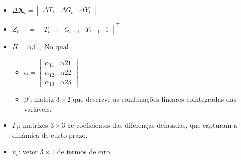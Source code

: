 \documentclass[a4paper, 12pt, openany, oneside, brazil]{abntex2}
\begin{document}


\postextual



%







% 
% 
%



% 



\begin{itemize}
	\item $\Delta \mathbf{X}_t = \begin{bmatrix} \Delta T_t & \Delta G_t & \Delta Y_t \end{bmatrix}^\mathsf{T}$
	\item $Z_{t-1} = \begin{bmatrix}
			T_{t-1} & G_{t-1} & Y_{t-1} & 1
	\end{bmatrix}^\mathsf{T}$
	\item $\Pi = \alpha \beta^\mathsf{T},\text{ No qual:}$
	\begin{itemize}
		\item $\alpha = \begin{bmatrix}
				\alpha_{11} & \alpha{21} \\
				\alpha_{12} & \alpha{22} \\
				\alpha_{13} & \alpha{23}
			\end{bmatrix}$
            \item \(\beta'\): matriz \(3 \times 2\) que descreve as combinações lineares cointegradas das variáveis.
        \end{itemize}
    \item \(\Gamma_i\): matrizes \(3 \times 3\) de coeficientes das diferenças defasadas, que capturam a dinâmica de curto prazo.
    \item \(u_t\): vetor \(3 \times 1\) de termos de erro.
\end{itemize}

\end{document}
